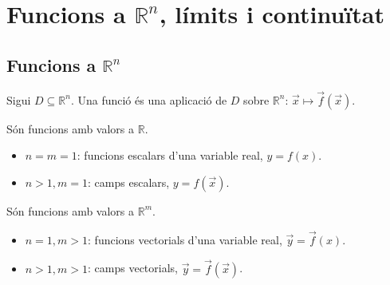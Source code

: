 \section{Funcions a $\mathbb{R}^{n}$, límits i continuïtat}
\subsection{Funcions a $\mathbb{R}^{n}$}
Sigui $D \subseteq \mathbb{R}^{n}$. Una funció és una aplicació de $D$ sobre $\mathbb{R}^{n}$: $\vec{x} \mapsto \vec{f}(\vec{x})$.
    \begin{defi}
    Són funcions amb valors a $\mathbb{R}$.
    \begin{itemize}
        \item $n=m=1$: funcions escalars d'una variable real, $y = f(x)$.
        \item $n>1, m=1$: camps escalars, $y = f(\vec{x})$.
    \end{itemize}
\end{defi}
\begin{defi}
    Són funcions amb valors a $\mathbb{R}^{m}$.
    \begin{itemize}
        \item $n=1, m>1$: funcions vectorials d'una variable real, $\vec{y} = \vec{f}(x)$.
        \item $n>1, m>1$: camps vectorials, $\vec{y} = \vec{f}(\vec{x})$.
    \end{itemize}
\end{defi}

